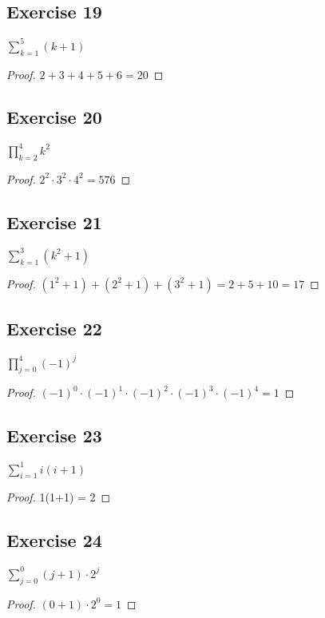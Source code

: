 \documentclass[14pt]{extarticle}
\newcommand{\dps}{\displaystyle}
\begin{document}
\subsection{Exercise 19}
$\dps\sum_{k=1}^{5}(k+1)$

\begin{proof}
    $2+3+4+5+6=20$
\end{proof}

\subsection{Exercise 20}
$\dps\prod_{k=2}^{4}{k}^2$

\begin{proof}
    $2^2\cdot 3^2\cdot 4^2 = 576$
\end{proof}

\subsection{Exercise 21}
$\dps\sum_{k=1}^{3}(k^2+1)$

\begin{proof}
    $(1^2+1) + (2^2+1) + (3^2+1) = 2+5+10 = 17$
\end{proof}

\subsection{Exercise 22}
$\dps\prod_{j=0}^{4}{(-1)}^j$

\begin{proof}
    $(-1)^0\cdot (-1)^1\cdot (-1)^2\cdot (-1)^3\cdot(-1)^4 = 1$
\end{proof}

\subsection{Exercise 23}
$\dps\sum_{i=1}^{1}i(i+1)$

\begin{proof}
    1(1+1) = 2
\end{proof}

\subsection{Exercise 24}
$\dps\sum_{j=0}^{0}(j+1)\cdot2^j$

\begin{proof}
    $(0+1)\cdot 2^0 = 1$
\end{proof}
\end{document}
